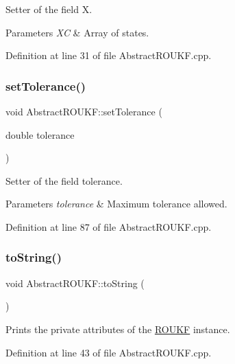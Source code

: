 Setter of the field {\ttfamily X}. 
\begin{DoxyParams}{Parameters}
{\em XC} & Array of states. \\
\hline
\end{DoxyParams}


Definition at line 31 of file Abstract\+R\+O\+U\+K\+F.\+cpp.

\mbox{\label{classAbstractROUKF_afc0c756daaba8dbaa4da1e38c97a16e2}} 
\subsubsection{\texorpdfstring{set\+Tolerance()}{setTolerance()}}
{\footnotesize\ttfamily void Abstract\+R\+O\+U\+K\+F\+::set\+Tolerance (\begin{DoxyParamCaption}\item[{double}]{tolerance }\end{DoxyParamCaption})}

Setter of the field {\ttfamily tolerance}. 
\begin{DoxyParams}{Parameters}
{\em tolerance} & Maximum tolerance allowed. \\
\hline
\end{DoxyParams}


Definition at line 87 of file Abstract\+R\+O\+U\+K\+F.\+cpp.

\mbox{\label{classAbstractROUKF_a663975374b647bd1ce1b4dc54e937de9}} 
\subsubsection{\texorpdfstring{to\+String()}{toString()}}
{\footnotesize\ttfamily void Abstract\+R\+O\+U\+K\+F\+::to\+String (\begin{DoxyParamCaption}{ }\end{DoxyParamCaption})}

Prints the private attributes of the \mbox{\hyperlink{classROUKF}{R\+O\+U\+KF}} instance. 

Definition at line 43 of file Abstract\+R\+O\+U\+K\+F.\+cpp.



